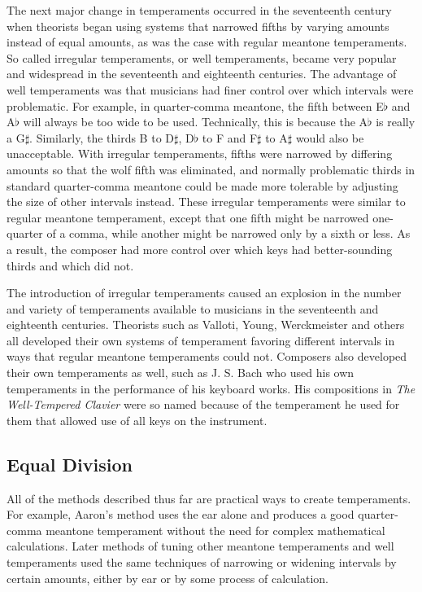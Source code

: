 The next major change in temperaments occurred in the seventeenth century when theorists began using
systems that narrowed fifths by varying amounts instead of equal amounts, as was the case with
regular meantone temperaments.  So called irregular temperaments, or well temperaments, became very
popular and widespread in the seventeenth and eighteenth centuries.  The advantage of well
temperaments was that musicians had finer control over which intervals were problematic.  For
example, in quarter-comma meantone, the fifth between E$\flat$ and A$\flat$ will always be too wide
to be used.  Technically, this is because the A$\flat$ is really a G$\sharp$. \autocite[35]{RD:1}
Similarly, the thirds B to D$\sharp$, D$\flat$ to F and F$\sharp$ to A$\sharp$ would also be
unacceptable.  With irregular temperaments, fifths were narrowed by differing amounts so that the
wolf fifth was eliminated, and normally problematic thirds in standard quarter-comma meantone could
be made more tolerable by adjusting the size of other intervals instead. These irregular
temperaments were similar to regular meantone temperament, except that one fifth might be narrowed
one-quarter of a comma, while another might be narrowed only by a sixth or less.  As a result, the
composer had more control over which keys had better-sounding thirds and which did not.

The introduction of irregular temperaments caused an explosion in the number and variety of
temperaments available to musicians in the seventeenth and eighteenth centuries. Theorists such as
Valloti, Young, Werckmeister and others all developed their own systems of temperament favoring
different intervals in ways that regular meantone temperaments could not.  Composers also developed
their own temperaments as well, such as J. S. Bach who used his own temperaments in the performance
of his keyboard works.  His compositions in \textit{The Well-Tempered Clavier} were so named because
of the temperament he used for them that allowed use of all keys on the instrument.

\subsection{Equal Division}

All of the methods described thus far are practical ways to create temperaments.
For example, Aaron's method uses the ear alone and produces a good quarter-comma 
meantone temperament without the need for complex mathematical calculations. Later methods
of tuning other meantone temperaments and well temperaments used the same techniques of
narrowing or widening intervals by certain amounts, either by ear or by some process of
calculation.

